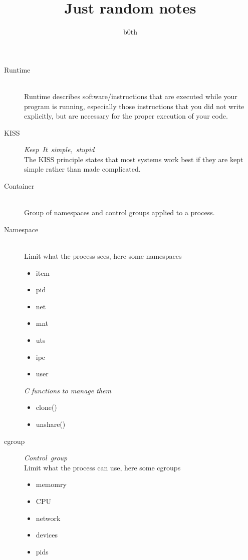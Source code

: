 \documentclass{article}
\title{Just random notes}
\author{b0th}
\begin{document}
\maketitle

\begin{description}
    \item[Runtime] \mbox{}\\Runtime describes software/instructions that are executed while your program is running, especially those instructions that you did not write explicitly, but are necessary for the proper execution of your code.
    \item[KISS] \mbox{\textit{Keep It simple, stupid}}\\ The KISS principle states that most systems work best if they are kept simple rather than made complicated.
    \item[Container] \mbox{}\\ Group of namespaces and control groups applied to a process.
    \item[Namespace] \mbox{}\\ Limit what the process sees, here some namespaces
    
    \begin{itemize}
        \item item
        \item pid
        \item net
        \item mnt
        \item uts
        \item ipc
        \item user
    \end{itemize}

    \textit{C functions to manage them}

    \begin{itemize}
        \item clone()
        \item unshare()
    \end{itemize}

    \item[cgroup] \mbox{\textit{Control group}}\\ Limit what the process can use, here some cgroups
    \begin{itemize}
        \item memomry
        \item CPU
        \item network
        \item devices
        \item pids
    \end{itemize} 

\end{description}
\end{document}
